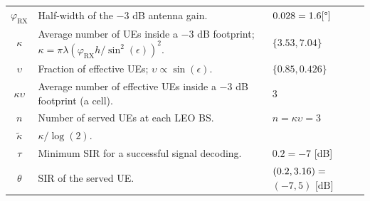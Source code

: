 \documentclass[lettersize,journal]{IEEEtran}
\begin{document}
\begin{table}
\begin{center}
\begin{tabular}{c|p{4.5cm}|p{1.9cm}}
      $\varphi_{\text{RX}}$ & Half-width of the $-3$ dB antenna gain.&$0.028= 1.6 [\degree] \hfill $ \\      
      $\kappa$& Average number of UEs inside a $-3$ dB footprint; $\kappa =\pi \lambda \left({\varphi_{\text{RX}}}h/{\sin^2(\epsilon)}\right)^2$.& $\{3.53,7.04\}$ \\
      $\upsilon$&Fraction of effective UEs; $\upsilon \propto \sin(\epsilon)$. &$\{0.85,0.426\}$ \\      
      $\kappa \upsilon$& Average number of effective UEs inside a $-3$ dB footprint (a cell).& $3$ \\
      $n$& Number of served UEs at each LEO BS.&  $n=\kappa \upsilon=3$ \\
      $\tilde{\kappa} $& $\kappa/\log(2)$. \\
      $\tau$ & Minimum SIR for a successful signal decoding.&$0.2=-7$ [dB] \\
      $\theta$ & SIR of the served UE.&$(0.2,3.16)=\hfill$  \break  $(-7,5) \text{ [dB]}$ \\
     \bottomrule
    \end{tabular}
  \end{center}
\end{table}   
\end{document}
